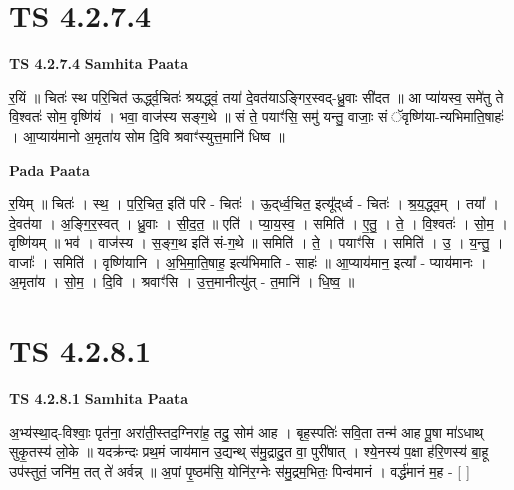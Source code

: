 \documentclass[17pt]{extarticle}
\begin{document}
\section*{ TS 4.2.7.4 }

\textbf{TS 4.2.7.4 } \newline
\textbf{Samhita Paata} \newline

र॒यिं ॥ चितः॑ स्थ परि॒चित॑ ऊर्द्ध्व॒चितः॑ श्रयद्ध्वं॒ तया॑ दे॒वत॑याऽङ्गिर॒स्वद्-ध्रु॒वाः सी॑दत ॥ आ प्या॑यस्व॒ समे॑तु ते वि॒श्वतः॑ सोम॒ वृष्णि॑यं । भवा॒ वाज॑स्य सङ्ग॒थे ॥ सं ते॒ पयाꣳ॑सि॒ समु॑ यन्तु॒ वाजाः॒ सं ॅवृष्णि॑या-न्यभिमाति॒षाहः॑ । आ॒प्याय॑मानो अ॒मृता॑य सोम दि॒वि श्रवाꣳ॑स्युत्त॒मानि॑ धिष्व ॥ \newline

\textbf{Pada Paata} \newline

र॒यिम् ॥ चितः॑ । स्थ॒ । प॒रि॒चित॒ इति॑ परि - चितः॑ । ऊ॒द्‌र्ध्व॒चित॒ इत्यू᳚द्‌र्ध्व - चितः॑ । श्र॒य॒द्ध्व॒म् । तया᳚ । दे॒वत॑या । अ॒ङ्गि॒र॒स्वत् । ध्रु॒वाः । सी॒द॒त॒ ॥ एति॑ । प्या॒य॒स्व॒ । समिति॑ । ए॒तु॒ । ते॒ । वि॒श्वतः॑ । सो॒म॒ । वृष्णि॑यम् ॥ भव॑ । वाज॑स्य । स॒ङ्ग॒थ इति॑ सं-ग॒थे ॥ समिति॑ । ते॒ । पयाꣳ॑सि । समिति॑ । उ॒ । य॒न्तु॒ । वाजाः᳚ । समिति॑ । वृष्णि॑यानि । अ॒भि॒मा॒ति॒षाह॒ इत्य॑भिमाति - साहः॑ ॥ आ॒प्याय॑मान॒ इत्या᳚ - प्याय॑मानः । अ॒मृता॑य । सो॒म॒ । दि॒वि । श्रवाꣳ॑सि । उ॒त्त॒मानीत्यु॑त् - त॒मानि॑ । धि॒ष्व॒ ॥  \newline




\section*{ TS 4.2.8.1 }

\textbf{TS 4.2.8.1 } \newline
\textbf{Samhita Paata} \newline

अ॒भ्य॑स्था॒द्-विश्वाः॒ पृत॑ना॒ अरा॑ती॒स्तद॒ग्निरा॑ह॒ तदु॒ सोम॑ आह । बृह॒स्पतिः॑ सवि॒ता तन्म॑ आह पू॒षा मा॑ऽधाथ् सुकृ॒तस्य॑ लो॒के ॥ यदक्र॑न्दः प्रथ॒मं जाय॑मान उ॒द्यन्थ् स॑मु॒द्रादु॒त वा॒ पुरी॑षात् । श्ये॒नस्य॑ प॒क्षा ह॑रि॒णस्य॑ बा॒हू उप॑स्तुतं॒ जनि॑म॒ तत् ते॑ अर्वन्न् ॥ अ॒पां पृ॒ष्ठम॑सि॒ योनि॑र॒ग्नेः स॑मु॒द्रम॒भितः॒ पिन्व॑मानं । वर्द्ध॑मानं म॒ह - [  ] \newline
\end{document}
